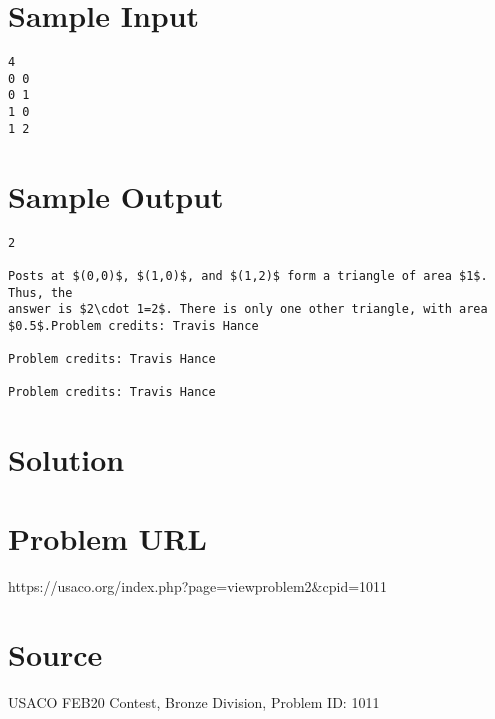 \documentclass[12pt]{article}
\begin{document}
\section*{Sample Input}
\begin{verbatim}
4
0 0
0 1
1 0
1 2
\end{verbatim}

\section*{Sample Output}
\begin{verbatim}
2

Posts at $(0,0)$, $(1,0)$, and $(1,2)$ form a triangle of area $1$. Thus, the
answer is $2\cdot 1=2$. There is only one other triangle, with area $0.5$.Problem credits: Travis Hance

Problem credits: Travis Hance

Problem credits: Travis Hance
\end{verbatim}

\section*{Solution}


\section*{Problem URL}
https://usaco.org/index.php?page=viewproblem2&cpid=1011

\section*{Source}
USACO FEB20 Contest, Bronze Division, Problem ID: 1011
\end{document}
